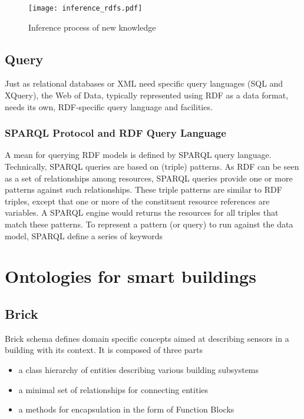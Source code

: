 \begin{figure}
  \centering
  \texttt{[image: inference\_rdfs.pdf]}
  \caption{Inference process of new knowledge}
  \label{fig:inference_rdfs}
\end{figure}

\subsection{Query}
Just as relational databases or XML need specific query languages (SQL and XQuery), the Web of Data, typically represented using RDF as a data format, needs its own, RDF-specific query language and facilities.

\subsubsection{SPARQL Protocol and RDF Query Language}
A mean for querying RDF models is defined by SPARQL \cite{sparql_reccomendation} query language. Technically, SPARQL queries are based on (triple) patterns. As RDF can be seen as a set of relationships among resources, SPARQL queries provide one or more patterns against such relationships. These triple patterns are similar to RDF triples, except that one or more of the constituent resource references are variables. A SPARQL engine would returns the resources for all triples that match these patterns. To represent a pattern (or query) to run against the data model, SPARQL define a series of keywords %

\section{Ontologies for smart buildings}
\subsection{Brick} \label{subsec:brick}
Brick schema \cite{brick_schema} defines domain specific concepts aimed at describing sensors in a building with its context. It is composed of three parts
\begin{itemize}
  \item a class hierarchy of entities describing various building subsystems
  \item a minimal set of relationships for connecting entities
  \item a methods for encapsulation in the form of Function Blocks
\end{itemize}

